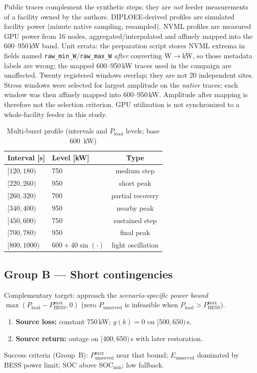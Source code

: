 \documentclass{ieeeaccess}
\begin{document}
Public traces complement the synthetic steps; they are \emph{not} feeder measurements of a facility owned by the authors. DIPLOEE-derived profiles are simulated facility power (minute native sampling, resampled). NVML profiles are measured GPU power from 16 nodes, aggregated/interpolated and affinely mapped into the 600--950\,kW band. Unit errata: the preparation script stores NVML extrema in fields named \texttt{raw\_min\_W}/\texttt{raw\_max\_W} \emph{after} converting W$\to$kW, so those metadata labels are wrong; the mapped 600--950\,kW traces used in the campaign are unaffected. Twenty registered windows overlap; they are not 20 independent sites. Stress windows were selected for largest amplitude on the \emph{native} traces; each window was then affinely mapped into 600--950\,kW. Amplitude after mapping is therefore not the selection criterion. GPU utilization is not synchronized to a whole-facility feeder in this study.

\begin{table}[!t]
\centering
\caption{Multi-burst profile (intervals and $P_{\mathrm{load}}$ levels; base \SI{600}{\kilo\watt})}
\label{tab:multiburst}
\begin{tabular}{@{}llc@{}}
\toprule
Interval [s] & Level [kW] & Type \\
\midrule
$[120,180)$ & 750 & medium step \\
$[220,260)$ & 950 & short peak \\
$[260,320)$ & 700 & partial recovery \\
$[340,400)$ & 950 & nearby peak \\
$[450,600)$ & 750 & sustained step \\
$[700,780)$ & 950 & final peak \\
$[800,1000)$ & $600+40\sin(\cdot)$ & light oscillation \\
\bottomrule
\end{tabular}
\end{table}

\subsection{Group B --- Short contingencies}
Complementary target: approach the \emph{scenario-specific power bound} $\max(P_{\mathrm{load}}-P_{\mathrm{BESS}}^{\max},0)$ (zero $P_{\mathrm{unserved}}$ is infeasible when $P_{\mathrm{load}}>P_{\mathrm{BESS}}^{\max}$).
\begin{enumerate}
\item \textbf{Source loss:} constant 750\,kW; $g(k)=0$ on $[500,650)$\,s.
\item \textbf{Source return:} outage on $[400,650)$\,s with later restoration.
\end{enumerate}
Success criteria (Group~B): $P_{\mathrm{unserved}}^{\max}$ near that bound; $E_{\mathrm{unserved}}$ dominated by BESS power limit; SOC above $\mathrm{SOC}_{\min}$; low fallback.
\end{document}
